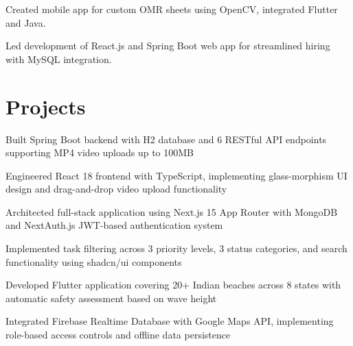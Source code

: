 \documentclass[]{deedy-resume-reversed}
\begin{document}
\begin{minipage}[t]{0.60\textwidth}
\begin{tightemize}
\item Created mobile app for custom OMR sheets using OpenCV, integrated Flutter and Java.
\item Led development of React.js and Spring Boot web app for streamlined hiring with MySQL integration.
\end{tightemize}
\sectionsep


\section{Projects}
\begin{tightemize}
\item Built Spring Boot backend with H2 database and 6 RESTful API endpoints supporting MP4 video uploads up to 100MB
\item Engineered React 18 frontend with TypeScript, implementing glass-morphism UI design and drag-and-drop video upload functionality
\end{tightemize}
\sectionsep
{}
\begin{tightemize}
\item Architected full-stack application using Next.js 15 App Router with MongoDB and NextAuth.js JWT-based authentication system
\item Implemented task filtering across 3 priority levels, 3 status categories, and search functionality using shadcn/ui components
\end{tightemize}
\sectionsep
{}
\begin{tightemize}
\item Developed Flutter application covering 20+ Indian beaches across 8 states with automatic safety assessment based on wave height
\item Integrated Firebase Realtime Database with Google Maps API, implementing role-based access controls and offline data persistence
\end{tightemize}
\sectionsep


\end{minipage}
\end{document}
